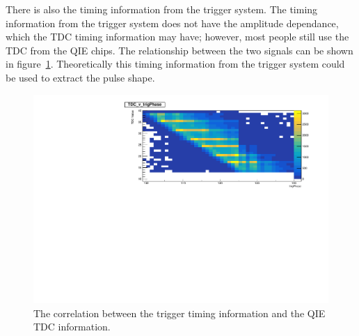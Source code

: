 There is also the timing information from the trigger system. The timing information from the trigger system does not have the amplitude dependance, which the TDC timing information may have; however, most people still use the TDC from the QIE chips. The relationship between the two signals can be shown in figure~\ref{fig:tdc}. Theoretically this timing information from the trigger system could be used to extract the pulse shape.

\begin{figure}
\centering
\includegraphics[width=\linewidth]{Figures/TDCvTrigPhase.pdf}
\caption{The correlation between the trigger timing information and the QIE TDC information.}
\label{fig:tdc}
\end{figure}

